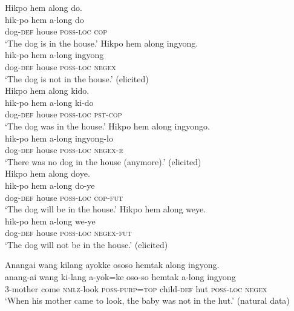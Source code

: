 \documentclass[output=paper,colorlinks,citecolor=brown]{langscibook}
\begin{document}
\ea\label{ex:amr:28}
        \ea\label{ex:amr:28a} Hikpo hem along do.  \\ 
            \gll hik-po hem a-long do \\
                  dog-\textsc{def} house \textsc{poss}{}-\textsc{loc} \textsc{cop} \\
            \glt  ‘The dog is in the house.’ 
        \ex\label{ex:amr:28b} Hikpo hem along ingyong.  \\
            \gll hik-po hem a-long ingyong\\
                   dog-\textsc{def} house \textsc{poss}{}-\textsc{loc} \textsc{negex}\\
            \glt ‘The dog is not in the house.’ (elicited)\\
        \z
    \z
    \ea\label{ex:amr:29}
        \ea\label{ex:amr:29a}Hikpo hem along kido.  \\
            \gll hik-po hem a-long ki-do \\
                  dog-\textsc{def} house \textsc{poss}{}-\textsc{loc} \textsc{pst}{}-\textsc{cop} \\
            \glt ‘The dog was in the house.’ 
        \ex\label{ex:amr:29b}Hikpo hem along ingyongo.  \\
            \gll hik-po hem a-long ingyong-lo \\
                  dog-\textsc{def} house \textsc{poss}{}-\textsc{loc} \textsc{negex-r} \\
            \glt ‘There was no dog in the house (anymore).’ (elicited)\\
    \z
 \z
\ea\label{ex:amr:30}
        \ea\label{ex:amr:30a}Hikpo hem along doye. \\ 
            \gll hik-po hem a-long do-ye  \\
                  dog-\textsc{def} house \textsc{poss}{}-\textsc{loc} \textsc{cop}{}-\textsc{fut}  \\
            \glt  ‘The dog will be in the house.’ 
        \ex\label{ex:amr:30b}Hikpo hem along weye. \\
            \gll hik-po hem a-long we-ye \\
                  dog-\textsc{def} house \textsc{poss}{}-\textsc{loc} \textsc{negex}{}-\textsc{fut}\\
            \glt ‘The dog will not be in the house.’ (elicited)
        \z
    \z 


\ea\label{ex:amr:31} Anangai wang kilang ayokke ososo hemtak along ingyong.\\
    \gll anang-ai wang ki-lang a-yok=ke oso-so hemtak a-long ingyong\\
          3-mother come \textsc{nmlz}{}-look \textsc{poss}{}-\textsc{purp}=\textsc{top} child-\textsc{def} hut \textsc{poss}{}-\textsc{loc} \textsc{negex}\\
    \glt ‘When his mother came to look, the baby was not in the hut.’ (natural data)
\z
\end{document}
